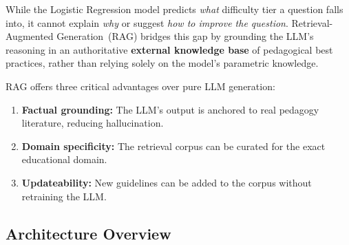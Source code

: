 \documentclass[12pt, a4paper, twoside]{article}
\begin{document}
While the Logistic Regression model predicts \emph{what} difficulty
tier a question falls into, it cannot explain \emph{why} or suggest
\emph{how to improve the question}. Retrieval-Augmented
Generation~(RAG) bridges this gap by grounding the LLM's reasoning
in an authoritative \textbf{external knowledge base} of pedagogical
best practices, rather than relying solely on the model's parametric
knowledge.

RAG offers three critical advantages over pure LLM generation:

\begin{enumerate}[leftmargin=2em]
    \item \textbf{Factual grounding:} The LLM's output is anchored to
          real pedagogy literature, reducing hallucination.
    \item \textbf{Domain specificity:} The retrieval corpus can be
          curated for the exact educational domain.
    \item \textbf{Updateability:} New guidelines can be added to the
          corpus without retraining the LLM.
\end{enumerate}

\subsection{Architecture Overview}
\end{document}
